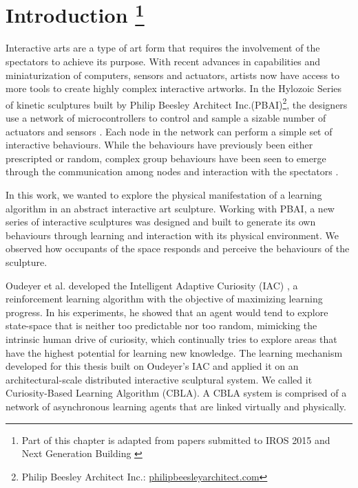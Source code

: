 

\chapter[Introduction]{Introduction
	\footnote{Part of this chapter is adapted from papers submitted to IROS 2015 \cite{Chan2015} and Next Generation Building \cite{Gorbet2015}}} 
\label{chap:intro}

Interactive arts are a type of art form that requires the involvement of the spectators to achieve its purpose. With recent advances in capabilities and miniaturization of computers, sensors and actuators, artists now have access to more tools to create highly complex interactive artworks. In the Hylozoic Series of kinetic sculptures built by Philip Beesley Architect Inc.(PBAI)\footnote{Philip Beesley Architect Inc.: \url{philipbeesleyarchitect.com}}, the designers use a network of microcontrollers to control and sample a sizable number of actuators and sensors \cite{Beesley2010} \cite{Beesley2010b}. Each node in the network can perform a simple set of interactive behaviours. While the behaviours have previously been either prescripted or random, complex group behaviours have been seen to emerge through the communication among nodes and interaction with the spectators \cite{Beesley2012}. 

In this work, we wanted to explore the physical manifestation of a learning algorithm in an abstract interactive art sculpture. Working with PBAI, a new series of interactive sculptures was designed and built to generate its own behaviours through learning and interaction with its physical environment. We observed how occupants of the space responds and perceive the behaviours of the sculpture. 
 
Oudeyer et al. developed the Intelligent Adaptive Curiosity (IAC) \cite{Oudeyer2007}, a reinforcement learning algorithm with the objective of maximizing learning progress. In his experiments, he showed that an agent would tend to explore state-space that is neither too predictable nor too random, mimicking the intrinsic human drive of curiosity, which continually tries to explore areas that have the highest potential for learning new knowledge. The learning mechanism developed for this thesis built on Oudeyer's IAC and applied it on an architectural-scale distributed interactive sculptural system. We called it Curiosity-Based Learning Algorithm (CBLA). A CBLA system is comprised of a network of asynchronous learning agents that are linked virtually and physically.  

